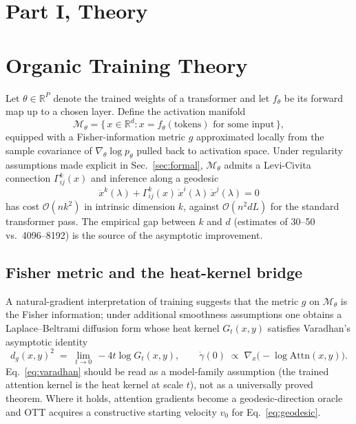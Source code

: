 \documentclass[11pt]{article}
\begin{document}
\section*{Part I, Theory}

\section{Organic Training Theory}
\label{sec:ott}

Let $\theta\in\mathbb{R}^P$ denote the trained weights of a transformer and let
$f_\theta$ be its forward map up to a chosen layer. Define the activation
manifold
\begin{equation}
\mathcal{M}_\theta = \{\,x\in\mathbb{R}^d : x = f_\theta(\text{tokens}) \text{ for some input}\,\},
\end{equation}
equipped with a Fisher-information metric $g$ approximated locally from the
sample covariance of $\nabla_\theta\log p_\theta$ pulled back to activation
space. Under regularity assumptions made explicit in Sec.~\ref{sec:formal},
$\mathcal{M}_\theta$ admits a Levi-Civita connection
$\Gamma^k_{ij}(x)$ and inference along a geodesic
\begin{equation}
\ddot x^k(\lambda) + \Gamma^k_{ij}(x)\,\dot x^i(\lambda)\,\dot x^j(\lambda) = 0
\label{eq:geodesic}
\end{equation}
has cost $\mathcal{O}(nk^2)$ in intrinsic dimension $k$, against
$\mathcal{O}(n^2 dL)$ for the standard transformer pass. The empirical
gap between $k$ and $d$ (estimates of 30--50 vs.\ 4096--8192) is the source of
the asymptotic improvement.

\subsection{Fisher metric and the heat-kernel bridge}

A natural-gradient interpretation of training
\cite{golub1996matrix,nakkiran2021deep} suggests that the metric $g$ on
$\mathcal{M}_\theta$ is the Fisher information; under additional smoothness
assumptions one obtains a Laplace--Beltrami diffusion form whose heat kernel
$G_t(x,y)$ satisfies Varadhan's asymptotic identity
\begin{equation}
d_g(x,y)^2 \;=\; \lim_{t\to 0}\,-4t\log G_t(x,y),\qquad
\dot\gamma(0)\;\propto\;\nabla_x\bigl(-\log\mathrm{Attn}(x,y)\bigr).
\label{eq:varadhan}
\end{equation}
Eq.~\eqref{eq:varadhan} should be read as a model-family assumption (the
trained attention kernel is the heat kernel at scale $t$), not as a
universally proved theorem. Where it holds, attention gradients become a
geodesic-direction oracle and OTT acquires a constructive starting velocity
$v_0$ for Eq.~\eqref{eq:geodesic}.
\end{document}
